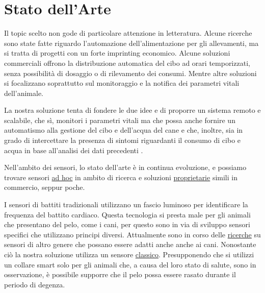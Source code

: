 

\chapter{Stato dell'Arte}
Il topic scelto non gode di particolare attenzione in letteratura. Alcune ricerche sono state fatte riguardo l'automazione dell’alimentazione per gli allevamenti, ma si tratta di progetti con un forte imprinting economico. 
Alcune soluzioni commerciali offrono la distribuzione automatica del cibo ad orari temporizzati, senza possibilità di dosaggio o di rilevamento dei consumi.
Mentre altre soluzioni si focalizzano soprattutto sul monitoraggio e la notifica dei parametri vitali dell'animale.

La nostra soluzione tenta di fondere le due idee e di proporre un sistema remoto e scalabile, che sì, monitori i parametri vitali ma che possa anche fornire un automatismo alla gestione del cibo e dell'acqua del cane e che, inoltre, sia in grado di intercettare la presenza di sintomi riguardanti il consumo di cibo e acqua in base all'analisi dei dati precedenti .

Nell'ambito dei sensori, lo stato dell'arte è in continua evoluzione, e possiamo trovare sensori \href{https://ciigar.csc.ncsu.edu/files/bib/Brugarolas2015-DogHeartMonitor.pdf}{ad hoc} in ambito di ricerca e soluzioni  \href{https://petpace.com/}{proprietarie} simili in commercio, seppur poche.

I sensori di battiti tradizionali utilizzano un fascio luminoso per identificare la frequenza del battito cardiaco. Questa tecnologia si presta male per gli animali che presentano del pelo, come i cani, per questo sono in via di sviluppo sensori specifici che utilizzano principi diversi. Attualmente sono in corso delle
\href{https://vcs.vetmed.wsu.edu/research/clinical-studies/clinincal-studies-detail/vcs-clinical-studies/2017/06/28/new-ecg-technology}{ricerche} su sensori di altro genere che possano essere adatti anche anche ai cani.
Nonostante ciò la nostra soluzione utilizza un sensore
\href{https://www.amazon.it/Haljia-Sensore-frequenza-cardiaca-Raspberry/dp/B01CBGH4N6}{classico}. Presupponendo che si utilizzi un collare smart solo per gli animali che, a causa del loro stato di salute, sono in osservazione, è possibile supporre che il pelo possa essere rasato durante il periodo di degenza.

